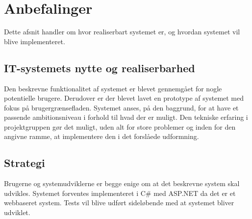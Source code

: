 \section{Anbefalinger}
Dette afsnit handler om hvor realiserbart systemet er, og hvordan systemet vil blive implementeret.

\subsection{IT-systemets nytte og realiserbarhed}
Den beskrevne funktionalitet af systemet er blevet gennemgået for nogle potentielle brugere. Derudover er der blevet lavet en prototype af systemet med fokus på brugergrænsefladen. Systemet anses, på den baggrund, for at have et passende ambitionsniveau i forhold til hvad der er muligt.
Den tekniske erfaring i projektgruppen gør det muligt, uden alt for store problemer og inden for den angivne ramme, at implementere den i det forslåede udformning.

\subsection{Strategi}
Brugerne og systemudviklerne er begge enige om at det beskrevne system skal udvikles. Systemet forventes implementeret i C\# med ASP.NET da det er et webbaseret system. Tests vil blive udført sideløbende med at systemet bliver udviklet.
